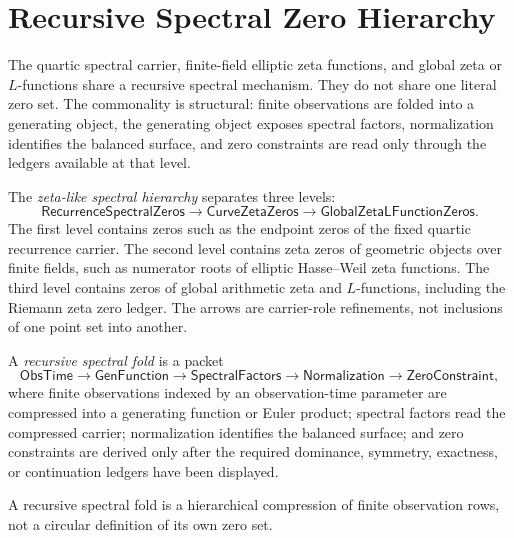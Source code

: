 \section{Recursive Spectral Zero Hierarchy}
\label{sec:unified-reality-recursive-spectral-zero-hierarchy}

The quartic spectral carrier, finite-field elliptic zeta functions, and
global zeta or $L$-functions share a recursive spectral mechanism.  They
do not share one literal zero set.  The commonality is structural:
finite observations are folded into a generating object, the generating
object exposes spectral factors, normalization identifies the balanced
surface, and zero constraints are read only through the ledgers available
at that level.

\begin{definition}
\label{def:unified-reality-zeta-like-spectral-hierarchy}
The \emph{zeta-like spectral hierarchy} separates three levels:
$$
\mathsf{RecurrenceSpectralZeros}
\longrightarrow
\mathsf{CurveZetaZeros}
\longrightarrow
\mathsf{GlobalZetaLFunctionZeros}.
$$
The first level contains zeros such as the endpoint zeros of the fixed
quartic recurrence carrier.  The second level contains zeta zeros of
geometric objects over finite fields, such as numerator roots of
elliptic Hasse--Weil zeta functions.  The third level contains zeros of
global arithmetic zeta and $L$-functions, including the Riemann zeta
zero ledger.  The arrows are carrier-role refinements, not inclusions of
one point set into another.
\end{definition}

\begin{definition}
\label{def:unified-reality-recursive-spectral-fold}
A \emph{recursive spectral fold} is a packet
$$
\mathsf{ObsTime}
\to
\mathsf{GenFunction}
\to
\mathsf{SpectralFactors}
\to
\mathsf{Normalization}
\to
\mathsf{ZeroConstraint},
$$
where finite observations indexed by an observation-time parameter are
compressed into a generating function or Euler product; spectral factors
read the compressed carrier; normalization identifies the balanced
surface; and zero constraints are derived only after the required
dominance, symmetry, exactness, or continuation ledgers have been
displayed.
\end{definition}

\begin{theorem}
\label{thm:unified-reality-recursive-spectral-fold-not-self-reference}
A recursive spectral fold is a hierarchical compression of finite
observation rows, not a circular definition of its own zero set.
\end{theorem}

